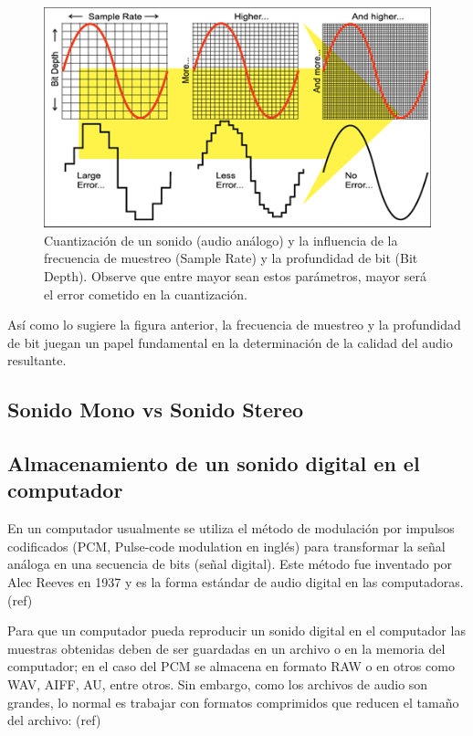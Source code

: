 \documentclass[conference,onecolumn]{IEEEtran}
\begin{document}
 \begin{figure}[H]
 \centering
    \includegraphics[scale=1]{img5.png}
    \caption{Cuantización de un sonido (audio análogo) y la influencia de la frecuencia de muestreo (Sample Rate) y la profundidad de bit (Bit Depth). Observe que entre mayor sean estos parámetros, mayor será el error cometido en la cuantización.}
\end{figure}

Así como lo sugiere la figura anterior, la frecuencia de muestreo y la profundidad de bit juegan un papel fundamental en la determinación de la calidad del audio resultante.

\subsection{Sonido Mono vs Sonido Stereo}


\subsection{Almacenamiento de un sonido digital en el computador}
En un computador usualmente se utiliza el método de modulación por impulsos codificados (PCM, Pulse-code modulation en inglés) para transformar la señal análoga en una secuencia de bits (señal digital). Este método fue inventado por Alec Reeves en 1937 y es la forma estándar de audio digital en las computadoras. (ref) 

Para que un computador pueda reproducir un sonido digital en el computador las muestras obtenidas deben de ser guardadas en un archivo o en la memoria del computador; en el caso del PCM se almacena en formato RAW o en otros como WAV, AIFF, AU, entre otros. Sin embargo, como los archivos de audio son grandes, lo normal es trabajar con formatos comprimidos que reducen el tamaño del archivo: (ref) \\
\end{document}
